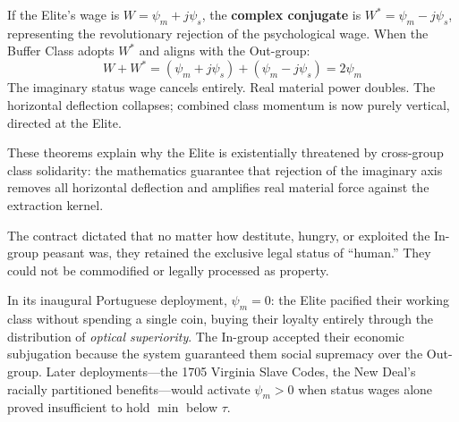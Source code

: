 \begin{theorem}
\label{thm:solidarity-cancellation}
If the Elite's wage is $W = \psi_m + j\psi_s$, the \textbf{complex conjugate}
is $W^* = \psi_m - j\psi_s$, representing the revolutionary rejection of the
psychological wage. When the Buffer Class adopts $W^*$ and aligns with the
Out-group:
\begin{equation}\label{eq:2.2e-solidarity-addition}
W + W^* = (\psi_m + j\psi_s) + (\psi_m - j\psi_s) = 2\psi_m
\end{equation}
The imaginary status wage cancels entirely. Real material power doubles. The
horizontal deflection collapses; combined class momentum is now purely vertical,
directed at the Elite.
\end{theorem}

These theorems explain why the Elite is existentially threatened by cross-group
class solidarity: the mathematics guarantee that rejection of the imaginary axis
removes all horizontal deflection and amplifies real material force against the
extraction kernel.

The contract dictated that no matter how destitute, hungry, or exploited the In-group peasant was, they retained the exclusive legal status of ``human.'' They could not be commodified or legally processed as property.

In its inaugural Portuguese deployment, $\psi_m = 0$: the Elite pacified their working class without spending a single coin, buying their loyalty entirely through the distribution of \textit{optical superiority}. The In-group accepted their economic subjugation because the system guaranteed them social supremacy over the Out-group. Later deployments---the 1705 Virginia Slave Codes, the New Deal's racially partitioned benefits---would activate $\psi_m > 0$ when status wages alone proved insufficient to hold $\min$ below $\tau$.

